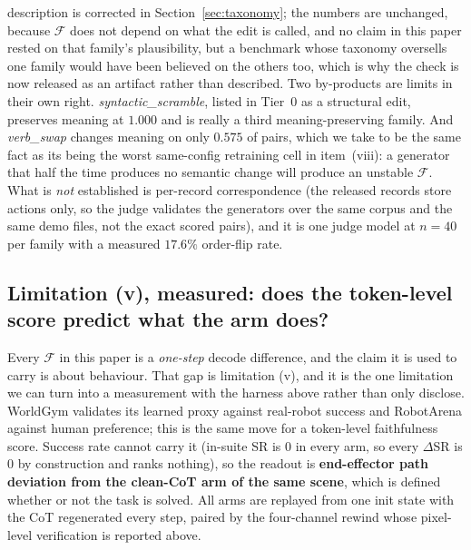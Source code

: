 \documentclass{article}
\begin{document}
description is corrected in Section~\ref{sec:taxonomy}; the numbers are unchanged, because $\mathcal{F}$ does not depend on what the edit is called, and no claim in this paper rested on that family's plausibility, but a benchmark whose taxonomy oversells one family would have been believed on the others too, which is why the check is now released as an artifact rather than described. Two by-products are limits in their own right. \emph{syntactic\_scramble}, listed in Tier~0 as a structural edit, preserves meaning at $1.000$ and is really a third meaning-preserving family. And \emph{verb\_swap} changes meaning on only $0.575$ of pairs, which we take to be the same fact as its being the worst same-config retraining cell in item~(viii): a generator that half the time produces no semantic change will produce an unstable $\mathcal{F}$. What is \emph{not} established is per-record correspondence (the released records store actions only, so the judge validates the generators over the same corpus and the same demo files, not the exact scored pairs), and it is one judge model at $n{=}40$ per family with a measured $17.6\%$ order-flip rate.

\subsection{Limitation (v), measured: does the token-level score predict what the arm does?}
\label{sec:deltapath}

Every $\mathcal{F}$ in this paper is a \emph{one-step} decode difference, and the claim it is used to carry is about behaviour. That gap is limitation (v), and it is the one limitation we can turn into a measurement with the harness above rather than only disclose. WorldGym validates its learned proxy against real-robot success and RobotArena against human preference; this is the same move for a token-level faithfulness score. Success rate cannot carry it (in-suite SR is $0$ in every arm, so every $\Delta$SR is $0$ by construction and ranks nothing), so the readout is \textbf{end-effector path deviation from the clean-CoT arm of the same scene}, which is defined whether or not the task is solved. All arms are replayed from one init state with the CoT regenerated every step, paired by the four-channel rewind whose pixel-level verification is reported above.
\end{document}
